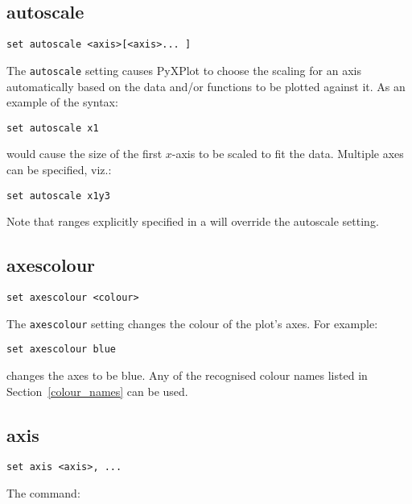 \subsection{autoscale}

\begin{verbatim}
set autoscale <axis>[<axis>... ] 
\end{verbatim}

The {\tt autoscale} setting causes PyXPlot to choose the scaling for an axis
automatically based on the data and/or functions to be plotted against it. As
an example of the syntax:

\begin{verbatim}
set autoscale x1
\end{verbatim}

\noindent would cause the size of the first $x$-axis to be scaled to fit the
data.  Multiple axes can be specified, viz.:

\begin{verbatim}
set autoscale x1y3
\end{verbatim}

Note that ranges explicitly specified in a  will override
the autoscale setting.


\subsection{axescolour}

\begin{verbatim}
set axescolour <colour>
\end{verbatim}

The {\tt axescolour} setting changes the colour of the plot's axes.  For example:

\begin{verbatim}
set axescolour blue
\end{verbatim}

\noindent changes the axes to be blue. Any of the recognised colour names listed in
Section~\ref{colour_names} can be used.
 

\subsection{axis}

\begin{verbatim}
set axis <axis>, ...
\end{verbatim}

The command:


